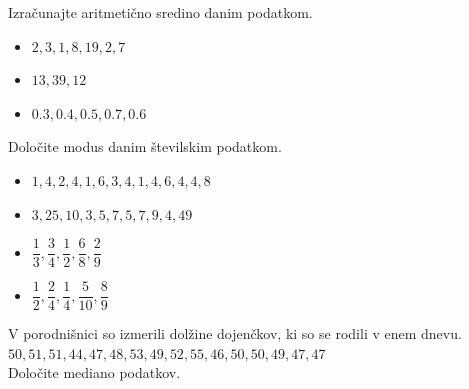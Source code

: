             \begin{naloga}
                Izračunajte aritmetično sredino danim podatkom.
                \begin{itemize}
                    \item $2, 3, 1, 8, 19, 2, 7$
                    \item $13, 39, 12$
                    \item $0.3, 0.4, 0.5, 0.7, 0.6$
                \end{itemize}            \end{naloga}
        

        
            \begin{naloga}
                Določite modus danim številskim podatkom.
                \begin{itemize}
                    \item $1, 4, 2, 4, 1, 6, 3, 4, 1, 4, 6, 4, 4, 8$
                    \item $3, 25, 10, 3, 5, 7, 5, 7, 9, 4, 49$
                    \item $\dfrac{1}{3}, \dfrac{3}{4}, \dfrac{1}{2}, \dfrac{6}{8}, \dfrac{2}{9}$
                    \item $\dfrac{1}{2}, \dfrac{2}{4}, \dfrac{1}{4}, \dfrac{5}{10}, \dfrac{8}{9}$
                \end{itemize}
            \end{naloga}

            \begin{naloga}
                V porodnišnici so izmerili dolžine dojenčkov, ki so se rodili v enem dnevu.  \\
                $50, 51, 51, 44, 47, 48, 53, 49, 52, 55, 46, 50, 50, 49, 47, 47$ \\
                Določite mediano podatkov.
            \end{naloga}

        

        
        
